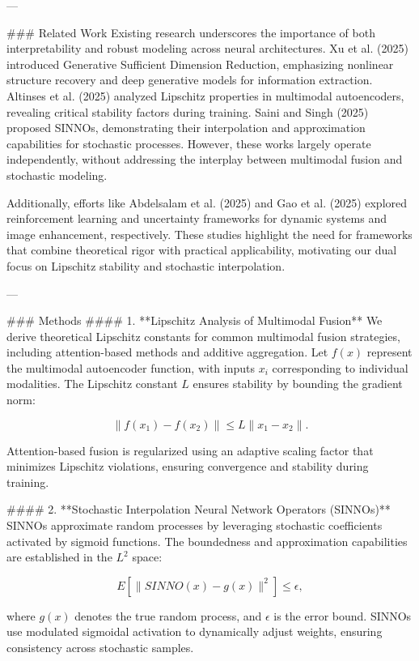 ---

### Related Work  
Existing research underscores the importance of both interpretability and robust modeling across neural architectures. Xu et al. (2025) introduced Generative Sufficient Dimension Reduction, emphasizing nonlinear structure recovery and deep generative models for information extraction. Altinses et al. (2025) analyzed Lipschitz properties in multimodal autoencoders, revealing critical stability factors during training. Saini and Singh (2025) proposed SINNOs, demonstrating their interpolation and approximation capabilities for stochastic processes. However, these works largely operate independently, without addressing the interplay between multimodal fusion and stochastic modeling.

Additionally, efforts like Abdelsalam et al. (2025) and Gao et al. (2025) explored reinforcement learning and uncertainty frameworks for dynamic systems and image enhancement, respectively. These studies highlight the need for frameworks that combine theoretical rigor with practical applicability, motivating our dual focus on Lipschitz stability and stochastic interpolation.

---

### Methods  
#### 1. **Lipschitz Analysis of Multimodal Fusion**  
We derive theoretical Lipschitz constants for common multimodal fusion strategies, including attention-based methods and additive aggregation. Let \( f(x) \) represent the multimodal autoencoder function, with inputs \( x_i \) corresponding to individual modalities. The Lipschitz constant \( L \) ensures stability by bounding the gradient norm:

\[
\| f(x_1) - f(x_2) \| \leq L \| x_1 - x_2 \|.
\]

Attention-based fusion is regularized using an adaptive scaling factor that minimizes Lipschitz violations, ensuring convergence and stability during training.

#### 2. **Stochastic Interpolation Neural Network Operators (SINNOs)**  
SINNOs approximate random processes by leveraging stochastic coefficients activated by sigmoid functions. The boundedness and approximation capabilities are established in the \( L^2 \) space:

\[
E[ \| SINNO(x) - g(x) \|^2 ] \leq \epsilon,
\]

where \( g(x) \) denotes the true random process, and \( \epsilon \) is the error bound. SINNOs use modulated sigmoidal activation to dynamically adjust weights, ensuring consistency across stochastic samples.


